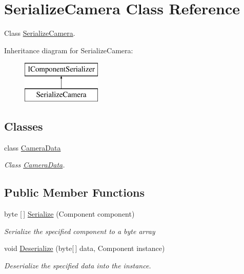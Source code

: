 \hypertarget{class_serialize_camera}{}\section{Serialize\+Camera Class Reference}
\label{class_serialize_camera}


Class \hyperlink{class_serialize_camera}{Serialize\+Camera}.  


Inheritance diagram for Serialize\+Camera\+:\begin{figure}[H]
\begin{center}
\leavevmode
\includegraphics[height=2.000000cm]{class_serialize_camera}
\end{center}
\end{figure}
\subsection*{Classes}
\begin{DoxyCompactItemize}
\item 
class \hyperlink{class_serialize_camera_1_1_camera_data}{Camera\+Data}
\begin{DoxyCompactList}\small\item\em Class \hyperlink{class_serialize_camera_1_1_camera_data}{Camera\+Data}. \end{DoxyCompactList}\end{DoxyCompactItemize}
\subsection*{Public Member Functions}
\begin{DoxyCompactItemize}
\item 
byte \mbox{[}$\,$\mbox{]} \hyperlink{class_serialize_camera_a003d716552672a6f3994a768aded2235}{Serialize} (Component component)
\begin{DoxyCompactList}\small\item\em Serialize the specified component to a byte array \end{DoxyCompactList}\item 
void \hyperlink{class_serialize_camera_af71e86c5582df1d9eb1d4e652fe00f83}{Deserialize} (byte\mbox{[}$\,$\mbox{]} data, Component instance)
\begin{DoxyCompactList}\small\item\em Deserialize the specified data into the instance. \end{DoxyCompactList}\end{DoxyCompactItemize}



